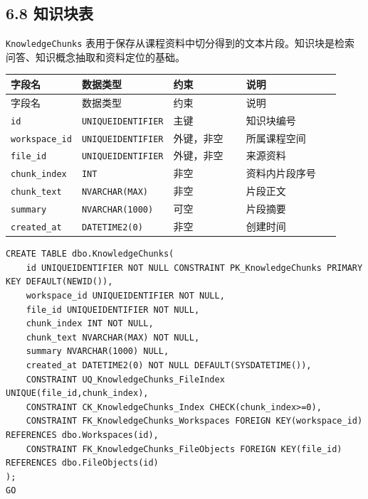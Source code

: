 \documentclass[10pt,a4paper,fontset=none]{ctexart}
\begin{document}
\subsection*{6.8 知识块表}

\texttt{KnowledgeChunks} 表用于保存从课程资料中切分得到的文本片段。知识块是检索问答、知识概念抽取和资料定位的基础。\par

\begingroup\scriptsize
\renewcommand{\arraystretch}{1.18}
\setlength{\LTleft}{0pt}
\setlength{\LTright}{0pt}
\begin{longtable}{>{\raggedright\arraybackslash}p{0.20\linewidth}>{\raggedright\arraybackslash}p{0.16\linewidth}>{\raggedright\arraybackslash}p{0.24\linewidth}>{\raggedright\arraybackslash}p{0.32\linewidth}}
\toprule
字段名 & 数据类型 & 约束 & 说明 \\
\midrule
\endfirsthead
\toprule
字段名 & 数据类型 & 约束 & 说明 \\
\midrule
\endhead
\texttt{id} & \texttt{UNIQUEIDENTIFIER} & 主键 & 知识块编号 \\
\texttt{workspace\_id} & \texttt{UNIQUEIDENTIFIER} & 外键，非空 & 所属课程空间 \\
\texttt{file\_id} & \texttt{UNIQUEIDENTIFIER} & 外键，非空 & 来源资料 \\
\texttt{chunk\_index} & \texttt{INT} & 非空 & 资料内片段序号 \\
\texttt{chunk\_text} & \texttt{NVARCHAR(MAX)} & 非空 & 片段正文 \\
\texttt{summary} & \texttt{NVARCHAR(1000)} & 可空 & 片段摘要 \\
\texttt{created\_at} & \texttt{DATETIME2(0)} & 非空 & 创建时间 \\
\bottomrule
\end{longtable}
\endgroup


\begin{Verbatim}[fontsize=\scriptsize,frame=single]
CREATE TABLE dbo.KnowledgeChunks(
    id UNIQUEIDENTIFIER NOT NULL CONSTRAINT PK_KnowledgeChunks PRIMARY KEY DEFAULT(NEWID()),
    workspace_id UNIQUEIDENTIFIER NOT NULL,
    file_id UNIQUEIDENTIFIER NOT NULL,
    chunk_index INT NOT NULL,
    chunk_text NVARCHAR(MAX) NOT NULL,
    summary NVARCHAR(1000) NULL,
    created_at DATETIME2(0) NOT NULL DEFAULT(SYSDATETIME()),
    CONSTRAINT UQ_KnowledgeChunks_FileIndex UNIQUE(file_id,chunk_index),
    CONSTRAINT CK_KnowledgeChunks_Index CHECK(chunk_index>=0),
    CONSTRAINT FK_KnowledgeChunks_Workspaces FOREIGN KEY(workspace_id) REFERENCES dbo.Workspaces(id),
    CONSTRAINT FK_KnowledgeChunks_FileObjects FOREIGN KEY(file_id) REFERENCES dbo.FileObjects(id)
);
GO
\end{Verbatim}
\end{document}
